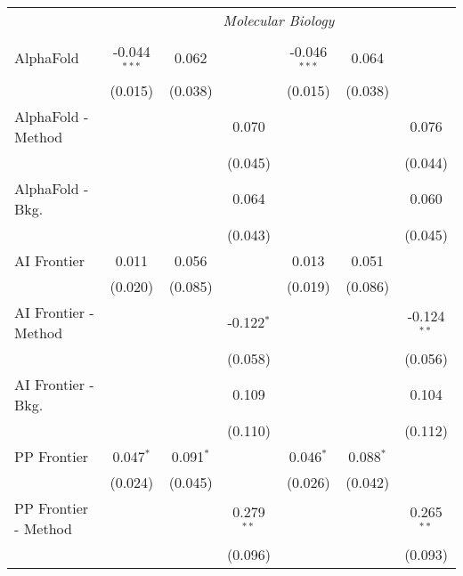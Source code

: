 \begin{tabular}{lcccccc}
 & \multicolumn{6}{c}{\textit{Molecular Biology}} \\ \\
   AlphaFold            & -0.044$^{***}$ & 0.062         &               & -0.046$^{***}$ & 0.064         &   \\   
                        & (0.015)        & (0.038)       &               & (0.015)        & (0.038)       &   \\   
   AlphaFold - Method   &                &               & 0.070         &                &               & 0.076\\   
                        &                &               & (0.045)       &                &               & (0.044)\\   
   AlphaFold - Bkg.     &                &               & 0.064         &                &               & 0.060\\   
                        &                &               & (0.043)       &                &               & (0.045)\\   
   AI Frontier          & 0.011          & 0.056         &               & 0.013          & 0.051         &   \\   
                        & (0.020)        & (0.085)       &               & (0.019)        & (0.086)       &   \\   
   AI Frontier - Method &                &               & -0.122$^{*}$  &                &               & -0.124$^{**}$\\   
                        &                &               & (0.058)       &                &               & (0.056)\\   
   AI Frontier - Bkg.   &                &               & 0.109         &                &               & 0.104\\   
                        &                &               & (0.110)       &                &               & (0.112)\\   
   PP Frontier          & 0.047$^{*}$    & 0.091$^{*}$   &               & 0.046$^{*}$    & 0.088$^{*}$   &   \\   
                        & (0.024)        & (0.045)       &               & (0.026)        & (0.042)       &   \\   
   PP Frontier - Method &                &               & 0.279$^{**}$  &                &               & 0.265$^{**}$\\   
                        &                &               & (0.096)       &                &               & (0.093)\\   

\end{tabular}
